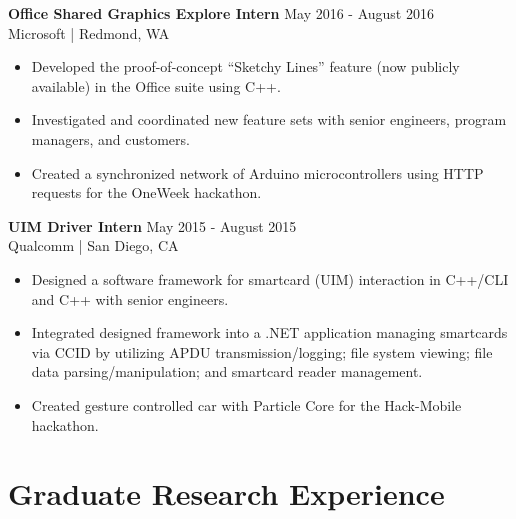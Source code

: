 \documentclass[line]{res}
\begin{document}
\begin{resume}
\vspace{-1mm}

\textbf{Office Shared Graphics Explore Intern} \hfill May 2016 - August 2016
\\
Microsoft | Redmond, WA
\\
\vspace{-3mm}
\begin{itemize}
\item Developed the proof-of-concept ``Sketchy Lines'' feature (now publicly available) in the Office suite using C++.
\item Investigated and coordinated new feature sets with senior engineers, program managers, and customers.
\item Created a synchronized network of Arduino microcontrollers using HTTP requests for the OneWeek hackathon.
\end{itemize}

\vspace{-1mm}

\textbf{UIM Driver Intern} \hfill May 2015 - August 2015
\\
Qualcomm | San Diego, CA
\\
\vspace{-3mm}
\begin{itemize}
\item Designed a software framework for smartcard (UIM) interaction in C++/CLI and C++ with senior engineers.
\item Integrated designed framework into a .NET application managing smartcards via CCID by utilizing APDU transmission/logging; file system viewing; file data parsing/manipulation; and smartcard reader management.
\item Created gesture controlled car with Particle Core for the Hack-Mobile hackathon.
\end{itemize}

\pagebreak

\section{\Large{Graduate Research Experience}}
\label{sec:gradexp}
\vspace{2mm}


\end{resume}
\end{document}
